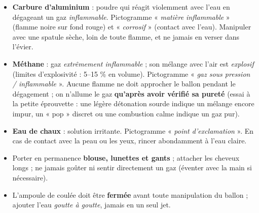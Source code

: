 \documentclass[11pt]{article}
\newcounter{popsec}
\newcounter{popsub}
\newcommand{\courssub}[1]{%
  \stepcounter{popsub}%
  \par\vspace{9pt}\noindent{\popxbold\fontsize{11.5}{13}\selectfont\color{popink}{\color{poporange}\thepopsec.\thepopsub}\hspace{6pt}#1}\par\nopagebreak\vspace{4pt}
}
\begin{document}
\begin{attention}
\begin{itemize}
\item \textbf{Carbure d'aluminium} : poudre qui réagit violemment avec l'eau en dégageant un gaz \emph{inflammable}. Pictogramme « \emph{matière inflammable} » (flamme noire sur fond rouge) et « \emph{corrosif} » (contact avec l'eau). Manipuler avec une spatule sèche, loin de toute flamme, et ne jamais en verser dans l'évier.
\item \textbf{Méthane} : gaz \emph{extrêmement inflammable} ; son mélange avec l'air est \emph{explosif} (limites d'explosivité : 5--15 \% en volume). Pictogramme « \emph{gaz sous pression / inflammable} ». Aucune flamme ne doit approcher le ballon pendant le dégagement ; on n'allume le gaz \textbf{qu'après avoir vérifié sa pureté} (essai à la petite éprouvette : une légère détonation sourde indique un mélange encore impur, un « pop » discret ou une combustion calme indique un gaz pur).
\item \textbf{Eau de chaux} : solution irritante. Pictogramme « \emph{point d'exclamation} ». En cas de contact avec la peau ou les yeux, rincer abondamment à l'eau claire.
\item Porter en permanence \textbf{blouse, lunettes et gants} ; attacher les cheveux longs ; ne jamais goûter ni sentir directement un gaz (éventer avec la main si nécessaire).
\item L'ampoule de coulée doit être \textbf{fermée} avant toute manipulation du ballon ; ajouter l'eau \emph{goutte à goutte}, jamais en un seul jet.
\end{itemize}
\end{attention}

\courssub{Schéma du dispositif}
\end{document}
